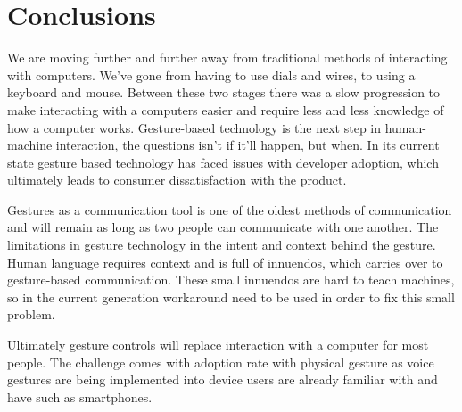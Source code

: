 \chapter{Conclusions}
We are moving further and further away from traditional methods of interacting with computers. We've gone from having to use dials and wires, to using a keyboard and mouse. Between these two stages there was a slow progression to make interacting with a computers easier and require less and less knowledge of how a computer works. Gesture-based technology is the next step in human-machine interaction, the questions isn't if it'll happen, but when. In its current state gesture based technology has faced issues with developer adoption, which ultimately leads to consumer dissatisfaction with the product. 

Gestures as a communication tool is one of the oldest methods of communication and will remain as long as two people can communicate with one another. The limitations in gesture technology in the intent and context behind the gesture. Human language requires context and is full of innuendos, which carries over to gesture-based communication. These small innuendos are hard to teach machines, so in the current generation workaround need to be used in order to fix this small problem.

Ultimately gesture controls will replace interaction with a computer for most people. The challenge comes with adoption rate with physical gesture as voice gestures are being implemented into device users are already familiar with and have such as smartphones.